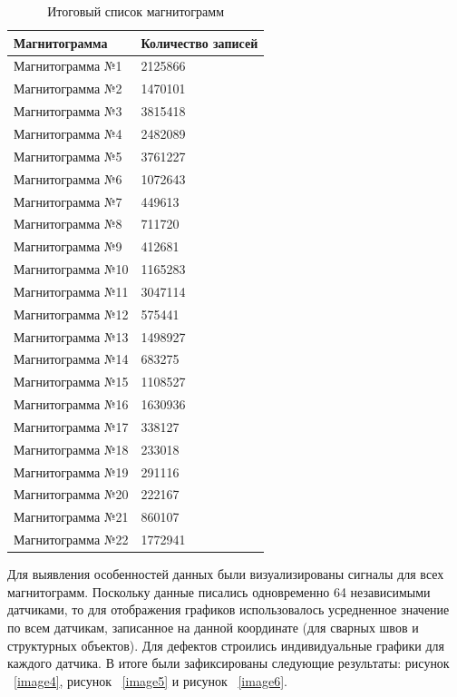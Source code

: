 \documentclass[a4paper,article,14pt]{extarticle}
\begin{document}
\begin{center}
    \begin{longtable}{|p{5cm}|p{5cm}|}
        \caption{Итоговый список магнитограмм}\\\hline
        Магнитограмма & Количество записей \\ \hline
        Магнитограмма №1 & 2125866 \\ \hline
        Магнитограмма №2 & 1470101 \\ \hline
        Магнитограмма №3 & 3815418 \\ \hline
        Магнитограмма №4 & 2482089 \\ \hline
        Магнитограмма №5 & 3761227 \\ \hline
        Магнитограмма №6 & 1072643 \\ \hline
        Магнитограмма №7 & 449613 \\ \hline
        Магнитограмма №8 & 711720 \\ \hline
        Магнитограмма №9 & 412681 \\ \hline
        Магнитограмма №10 & 1165283 \\ \hline
        Магнитограмма №11 & 3047114 \\ \hline
        Магнитограмма №12 & 575441 \\ \hline
        Магнитограмма №13 & 1498927\\ \hline
        Магнитограмма №14 & 683275 \\ \hline
        Магнитограмма №15 & 1108527 \\ \hline
        Магнитограмма №16 & 1630936 \\ \hline 
        Магнитограмма №17 & 338127 \\ \hline
        Магнитограмма №18 & 233018 \\ \hline
        Магнитограмма №19 & 291116 \\ \hline
        Магнитограмма №20 & 222167 \\ \hline
        Магнитограмма №21 & 860107 \\ \hline
        Магнитограмма №22 & 1772941 \\ \hline
    \end{longtable}
\end{center}

Для выявления особенностей данных были визуализированы сигналы для всех магнитограмм. 
Поскольку данные писались одновременно 64 независимыми датчиками, 
то для отображения графиков использовалось усредненное значение по всем датчикам, 
записанное на данной координате (для сварных швов и структурных объектов). 
Для дефектов строились индивидуальные графики для каждого датчика. 
В итоге были зафиксированы следующие результаты: рисунок ~\ref{image4}, рисунок ~\ref{image5} и рисунок ~\ref{image6}.
\end{document}
